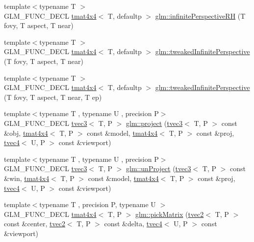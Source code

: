 \begin{DoxyCompactItemize}
{\footnotesize template$<$typename T $>$ }\\G\+L\+M\+\_\+\+F\+U\+N\+C\+\_\+\+D\+E\+CL \hyperlink{structglm_1_1tmat4x4}{tmat4x4}$<$ T, defaultp $>$ \hyperlink{group__gtc__matrix__transform_ga79575023763df88dff1bf8255a42d0be}{glm\+::infinite\+Perspective\+RH} (T fovy, T aspect, T near)
\item 
{\footnotesize template$<$typename T $>$ }\\G\+L\+M\+\_\+\+F\+U\+N\+C\+\_\+\+D\+E\+CL \hyperlink{structglm_1_1tmat4x4}{tmat4x4}$<$ T, defaultp $>$ \hyperlink{group__gtc__matrix__transform_gaed64bd81f5ecdab52fecbdf7f6b58194}{glm\+::tweaked\+Infinite\+Perspective} (T fovy, T aspect, T near)
\item 
{\footnotesize template$<$typename T $>$ }\\G\+L\+M\+\_\+\+F\+U\+N\+C\+\_\+\+D\+E\+CL \hyperlink{structglm_1_1tmat4x4}{tmat4x4}$<$ T, defaultp $>$ \hyperlink{group__gtc__matrix__transform_gaa50fce7f50b5d5da881ed30f5532a921}{glm\+::tweaked\+Infinite\+Perspective} (T fovy, T aspect, T near, T ep)
\item 
{\footnotesize template$<$typename T , typename U , precision P$>$ }\\G\+L\+M\+\_\+\+F\+U\+N\+C\+\_\+\+D\+E\+CL \hyperlink{structglm_1_1tvec3}{tvec3}$<$ T, P $>$ \hyperlink{group__gtc__matrix__transform_gad743556abd138264d4f06f4ca27f1d7e}{glm\+::project} (\hyperlink{structglm_1_1tvec3}{tvec3}$<$ T, P $>$ const \&obj, \hyperlink{structglm_1_1tmat4x4}{tmat4x4}$<$ T, P $>$ const \&model, \hyperlink{structglm_1_1tmat4x4}{tmat4x4}$<$ T, P $>$ const \&proj, \hyperlink{structglm_1_1tvec4}{tvec4}$<$ U, P $>$ const \&viewport)
\item 
{\footnotesize template$<$typename T , typename U , precision P$>$ }\\G\+L\+M\+\_\+\+F\+U\+N\+C\+\_\+\+D\+E\+CL \hyperlink{structglm_1_1tvec3}{tvec3}$<$ T, P $>$ \hyperlink{group__gtc__matrix__transform_ga82a558de3ce42cbeed0f6ec292a4e1b3}{glm\+::un\+Project} (\hyperlink{structglm_1_1tvec3}{tvec3}$<$ T, P $>$ const \&win, \hyperlink{structglm_1_1tmat4x4}{tmat4x4}$<$ T, P $>$ const \&model, \hyperlink{structglm_1_1tmat4x4}{tmat4x4}$<$ T, P $>$ const \&proj, \hyperlink{structglm_1_1tvec4}{tvec4}$<$ U, P $>$ const \&viewport)
\item 
{\footnotesize template$<$typename T , precision P, typename U $>$ }\\G\+L\+M\+\_\+\+F\+U\+N\+C\+\_\+\+D\+E\+CL \hyperlink{structglm_1_1tmat4x4}{tmat4x4}$<$ T, P $>$ \hyperlink{group__gtc__matrix__transform_ga9026c77505b99990f68826f27c267dc5}{glm\+::pick\+Matrix} (\hyperlink{structglm_1_1tvec2}{tvec2}$<$ T, P $>$ const \&center, \hyperlink{structglm_1_1tvec2}{tvec2}$<$ T, P $>$ const \&delta, \hyperlink{structglm_1_1tvec4}{tvec4}$<$ U, P $>$ const \&viewport)

\end{DoxyCompactItemize}
